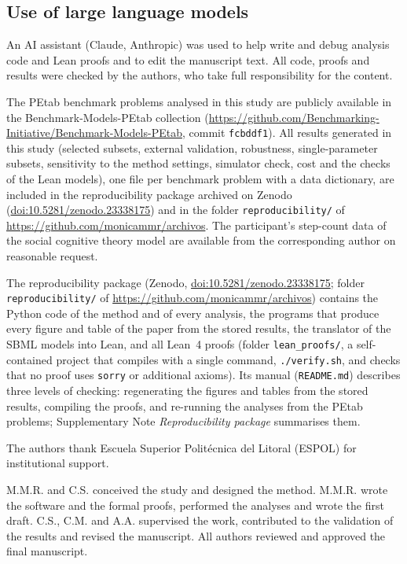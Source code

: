 \documentclass[pdflatex,sn-nature]{sn-jnl}
\theoremstyle{plain}
\newcommand{\zenododoi}{10.5281/zenodo.23338175}
\begin{document}
\subsection*{Use of large language models}

An AI assistant (Claude, Anthropic) was used to help write and debug analysis code and Lean proofs and to edit the manuscript text. All code, proofs and results were checked by the authors, who take full responsibility for the content.

\backmatter

The PEtab benchmark problems analysed in this study are publicly available in the Benchmark-Models-PEtab collection (\url{https://github.com/Benchmarking-Initiative/Benchmark-Models-PEtab}, commit \texttt{fcbddf1}). All results generated in this study (selected subsets, external validation, robustness, single-parameter subsets, sensitivity to the method settings, simulator check, cost and the checks of the Lean models), one file per benchmark problem with a data dictionary, are included in the reproducibility package archived on Zenodo (\href{https://doi.org/\zenododoi}{doi:\zenododoi}) and in the folder \texttt{reproducibility/} of \url{https://github.com/monicammr/archivos}. The participant's step-count data of the social cognitive theory model are available from the corresponding author on reasonable request.

The reproducibility package (Zenodo, \href{https://doi.org/\zenododoi}{doi:\zenododoi}; folder \texttt{reproducibility/} of \url{https://github.com/monicammr/archivos}) contains the Python code of the method and of every analysis, the programs that produce every figure and table of the paper from the stored results, the translator of the SBML models into Lean, and all Lean~4 proofs (folder \texttt{lean\_proofs/}, a self-contained project that compiles with a single command, \texttt{./verify.sh}, and checks that no proof uses \texttt{sorry} or additional axioms). Its manual (\texttt{README.md}) describes three levels of checking: regenerating the figures and tables from the stored results, compiling the proofs, and re-running the analyses from the PEtab problems; Supplementary Note \textit{Reproducibility package} summarises them.

The authors thank Escuela Superior Polit\'ecnica del Litoral (ESPOL) for institutional support.

M.M.R. and C.S. conceived the study and designed the method. M.M.R. wrote the software and the formal proofs, performed the analyses and wrote the first draft. C.S., C.M. and A.A. supervised the work, contributed to the validation of the results and revised the manuscript. All authors reviewed and approved the final manuscript.
\end{document}
